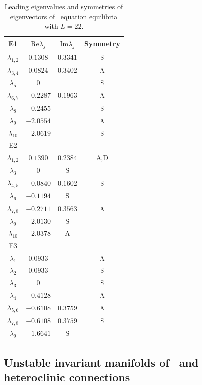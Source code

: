 \begin{table}[h!]
\caption{\label{tab:E1_sym} Leading eigenvalues and symmetries
of eigenvectors of \KS\ equation equilibria with $L = 22$.}
{\small
\begin{tabular}{cccc} \hline
E1 & $\mathrm{Re} \lambda_j$ & $\mathrm{Im} \lambda_j$ & Symmetry \\\hline
  $\lambda_{1,2}$ & $0.1308$& $0.3341$ & S \\
  $\lambda_{3,4}$ & $0.0824$& $0.3402$ & A \\
  $\lambda_{5}$   & $0$     &          & S \\
  $\lambda_{6,7}$ &$-0.2287$& $0.1963$ & A \\
  $\lambda_{8}$   &$-0.2455$&          & S \\
  $\lambda_{9}$   &$-2.0554$&          & A \\
  $\lambda_{10}$  &$-2.0619$&          & S \\\hline
E2 &  &  & \\\hline
  $\lambda_{1,2}$ & $0.1390$ & $0.2384$ & A,D \\
  $\lambda_{3}$   & $0$                 & S \\
  $\lambda_{4,5}$ &$-0.0840$ & $0.1602$ & S \\
  $\lambda_{6}$   &$-0.1194$            & S \\
  $\lambda_{7,8}$ &$-0.2711$ & $0.3563$ & A \\
  $\lambda_{9}$   &$-2.0130$            & S \\
  $\lambda_{10}$  &$-2.0378$            & A \\\hline
E3 &  &  & \\\hline
  $\lambda_{1}$   &$0.0933$  &          & A \\
  $\lambda_{2}$   &$0.0933$  &          & S \\
  $\lambda_{3}$   &$0$       &          & S \\
  $\lambda_{4}$   &$-0.4128$ &          & A \\
  $\lambda_{5,6}$ &$-0.6108$ & $0.3759$ & A \\
  $\lambda_{7,8}$ &$-0.6108$ & $0.3759$ & S \\
  $\lambda_{9}$   &$-1.6641$            & S \\\hline
\end{tabular}}
\end{table}


\subsection{Unstable invariant manifolds of \eqva\ and heteroclinic
connections}

